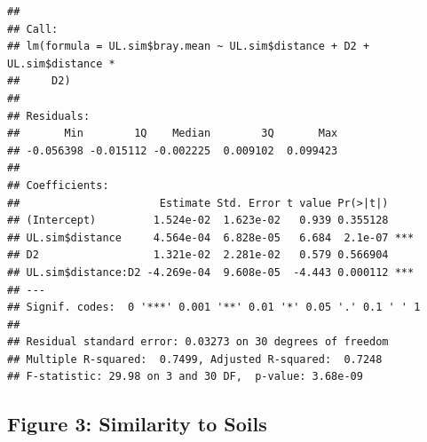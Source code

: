 \documentclass[]{article}
\newenvironment{Shaded}{\begin{snugshade}}{\end{snugshade}}
\newcommand{\DecValTok}[1]{\textcolor[rgb]{0.00,0.00,0.81}{#1}}
\newcommand{\StringTok}[1]{\textcolor[rgb]{0.31,0.60,0.02}{#1}}
\newcommand{\OperatorTok}[1]{\textcolor[rgb]{0.81,0.36,0.00}{\textbf{#1}}}
\newcommand{\NormalTok}[1]{#1}
\begin{document}
\begin{verbatim}
## 
## Call:
## lm(formula = UL.sim$bray.mean ~ UL.sim$distance + D2 + UL.sim$distance * 
##     D2)
## 
## Residuals:
##       Min        1Q    Median        3Q       Max 
## -0.056398 -0.015112 -0.002225  0.009102  0.099423 
## 
## Coefficients:
##                      Estimate Std. Error t value Pr(>|t|)    
## (Intercept)         1.524e-02  1.623e-02   0.939 0.355128    
## UL.sim$distance     4.564e-04  6.828e-05   6.684  2.1e-07 ***
## D2                  1.321e-02  2.281e-02   0.579 0.566904    
## UL.sim$distance:D2 -4.269e-04  9.608e-05  -4.443 0.000112 ***
## ---
## Signif. codes:  0 '***' 0.001 '**' 0.01 '*' 0.05 '.' 0.1 ' ' 1
## 
## Residual standard error: 0.03273 on 30 degrees of freedom
## Multiple R-squared:  0.7499, Adjusted R-squared:  0.7248 
## F-statistic: 29.98 on 3 and 30 DF,  p-value: 3.68e-09
\end{verbatim}

\begin{Shaded}
\end{Shaded}

\subsection{Figure 3: Similarity to
Soils}\label{figure-3-similarity-to-soils}
\end{document}
